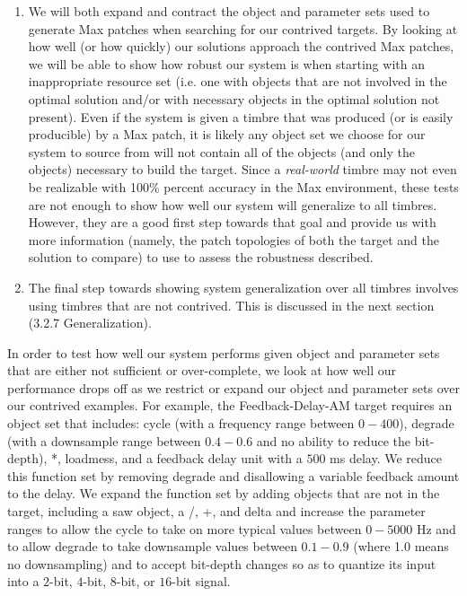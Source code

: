 \documentclass[12pt]{report} 	%
\numberwithin{figure}{chapter}
\numberwithin{table}{chapter}
\numberwithin{equation}{chapter}
\begin{document}
\begin{flushleft}
\begin{enumerate}
\item We will both expand and contract the object and parameter sets used to generate Max patches when searching for our contrived targets. By looking at how well (or how quickly) our solutions approach the contrived Max patches, we will be able to show how robust our system is when starting with an inappropriate resource set (i.e. one with objects that are not involved in the optimal solution and/or with necessary objects in the optimal solution not present). Even if the system is given a timbre that was produced (or is easily producible) by a Max patch, it is likely any object set we choose for our system to source from will not contain all of the objects (and only the objects) necessary to build the target. Since a \textit{real-world} timbre may not even be realizable with 100\% percent accuracy in the Max environment, these tests are not enough to show how well our system will generalize to all timbres. However, they are a good first step towards that goal and provide us with more information (namely, the patch topologies of both the target and the solution to compare) to use to assess the robustness described.
\item The final step towards showing system generalization over all timbres involves using timbres that are not contrived. This is discussed in the next section (3.2.7 Generalization).
\end{enumerate}

In order to test how well our system performs given object and parameter sets that are either not sufficient or over-complete, we look at how well our performance drops off as we restrict or expand our object and parameter sets over our contrived examples. For example, the Feedback-Delay-AM target requires an object set that includes: cycle\texttildelow{} (with a frequency range between $0-400$), degrade\texttildelow{} (with a downsample range between $0.4 - 0.6$ and no ability to reduce the bit-depth), *\texttildelow{}, loadmess, and a feedback delay unit with a $500$ ms delay. We reduce this function set by removing degrade\texttildelow{} and disallowing a variable feedback amount to the delay. We expand the function set by adding objects that are not in the target, including a saw\texttildelow{} object, a /\texttildelow{}, +\texttildelow{}, and delta\texttildelow{} and increase the parameter ranges to allow the cycle\texttildelow{}  to take on more typical values between $0-5000$ Hz and to allow degrade\texttildelow{}  to take downsample values between $0.1-0.9$ (where 1.0 means no downsampling) and to accept bit-depth changes so as to quantize its input into a $2$-bit, $4$-bit, $8$-bit, or $16$-bit signal. 


\end{flushleft}
\end{document}
